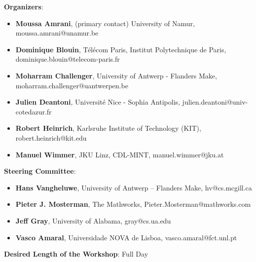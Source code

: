 \noindent
\textbf{Organizers}:
\begin{itemize}
    \item \textbf{Moussa Amrani}, (primary contact) University of Namur, moussa.amrani@unamur.be
    
    \item \textbf{Dominique Blouin}, T\'el\'ecom Paris, Institut Polytechnique de Paris, dominique.blouin@telecom-paris.fr
    
    \item \textbf{Moharram Challenger}, University of Antwerp - Flanders Make, moharram.challenger@uantwerpen.be

    \item \textbf{Julien Deantoni}, Universit\'e Nice - Sophia Antipolis, julien.deantoni@univ-cotedazur.fr

    \item \textbf{Robert Heinrich}, Karlsruhe Institute of Technology (KIT), robert.heinrich@kit.edu
    
    \item \textbf{Manuel Wimmer}, JKU Linz, CDL-MINT, manuel.wimmer@jku.at
    
\end{itemize}

\noindent
\textbf{Steering Committee}:
\begin{itemize}
    \item \textbf{Hans Vangheluwe}, University of Antwerp – Flanders Make, hv@cs.mcgill.ca
    \item \textbf{Pieter J. Mosterman}, The Mathworks, Pieter.Mosterman@mathworks.com
    \item \textbf{Jeff Gray}, University of Alabama, gray@cs.ua.edu
    \item \textbf{Vasco Amaral}, Universidade NOVA de Lisboa, vasco.amaral@fct.unl.pt
\end{itemize}

\noindent
\textbf{Desired Length of the Workshop}: Full Day \\

